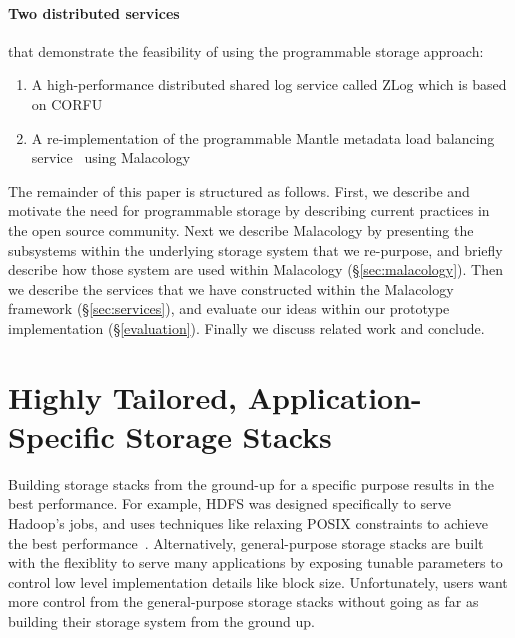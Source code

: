 \documentclass[10pt,twocolumn]{article}
\begin{document}
\paragraph*{Two distributed services} that demonstrate the feasibility of using
the programmable storage approach:

\begin{enumerate}

\item A high-performance distributed shared log service called ZLog which is
based on CORFU~\cite{balakrishnan_corfu_2012}

\item A re-implementation of the programmable Mantle metadata load balancing
service~\cite{sevilla:sc15-mantle} using Malacology

\end{enumerate}

The remainder of this paper is structured as follows. First, we describe and
motivate the need for programmable storage by describing current practices in
the open source community. Next we describe Malacology by presenting the
subsystems within the underlying storage system that we re-purpose, and briefly
describe how those system are used within Malacology (\S\ref{sec:malacology}).
Then we describe the services that we have constructed within the Malacology
framework (\S\ref{sec:services}), and evaluate our ideas within our prototype
implementation (\S\ref{evaluation}).  Finally we discuss related work and
conclude.

\section{Highly Tailored, Application-Specific Storage Stacks
}\label{highly-tailored-and-application-specifc-storage-systems}

Building storage stacks from the ground-up for a specific purpose results in
the best performance. For example, HDFS was designed specifically to serve
Hadoop's jobs, and uses techniques like relaxing POSIX constraints to achieve
the best performance~\cite{CITEME}. Alternatively, general-purpose storage
stacks are built with the flexiblity to serve many applications by exposing
tunable parameters to control low level implementation details like block size.
Unfortunately, users want more control from the general-purpose storage stacks
without going as far as building their storage system from the ground up.

\end{document}
